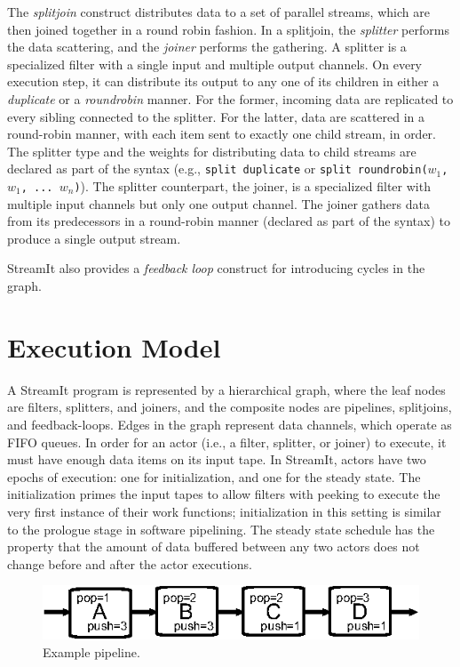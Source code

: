 The {\it splitjoin} construct distributes data to a set of parallel
streams, which are then joined together in a round robin fashion.  In
a splitjoin, the {\it splitter} performs the data scattering, and the
{\it joiner} performs the gathering. A splitter is a specialized
filter with a single input and  multiple output channels. On 
every execution step, it can distribute its output to any one of
its children in either a {\it duplicate} or a {\it roundrobin}
manner. For the former, incoming data are replicated to every
sibling connected to the splitter. For the latter, data are scattered
in a round-robin manner, with each item sent to exactly one child
stream, in order.  The splitter type and the weights for distributing data to
child streams are declared as part of the syntax (e.g., \texttt{split
duplicate} or \texttt{split roundrobin($w_1$, $w_1$, ... $w_n$)}). The
splitter counterpart, the joiner, is a specialized filter with  
multiple input channels but only one output channel. The joiner
gathers data from its predecessors in a round-robin manner (declared
as part of the syntax) to produce a single output stream.

StreamIt also provides a {\it feedback loop} construct for introducing
cycles in the graph.

\section{Execution Model}
\label{sec:execmodel}

A StreamIt program is represented by a hierarchical graph,
where the leaf nodes are filters, splitters, and joiners, and
the composite nodes are pipelines, splitjoins, and
feedback-loops. Edges in the graph represent data channels, which 
operate as FIFO queues.
In order for an actor  (i.e., a filter,
splitter, or joiner) to execute, it must have enough data items on its input
tape. In StreamIt, actors have  two epochs
of execution: one for initialization, and one for the steady
state. The initialization primes the input tapes to allow filters with
peeking to execute the very first instance of their work functions;
initialization in this setting is similar to the prologue stage in
software pipelining. The steady state schedule has the property that
the amount of data buffered between any two actors does not change
before and after the actor executions.

\begin{figure}[t]
\begin{center}
\vspace{-24pt}
 \includegraphics[scale=1, angle=0]{./pipe-with-rates.eps}
\vspace{-6pt}
 \caption{Example pipeline.}
 \label{fig:pipe-with-rates}
\end{center}
\end{figure}

